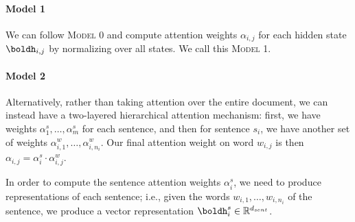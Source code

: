 \documentclass[12pt]{report}
\begin{document}
\paragraph{Model 1} We can follow \textsc{Model 0} and compute attention weights $\alpha_{i,j}$ for each hidden state $\boldh_{i,j}$ by normalizing over all states. We call this \textsc{Model 1}.

\paragraph{Model 2} Alternatively, rather than taking attention over the entire document, we can instead have a two-layered hierarchical attention mechanism: first, we have weights $\alpha_1^s, \ldots, \alpha_m^s$ for each sentence, and then for sentence $s_i$, we have another set of weights $\alpha_{i,1}^w, \ldots, \alpha_{i,n_i}^w$.
Our final attention weight on word $w_{i,j}$ is then $\alpha_{i,j} = \alpha_i^s \cdot \alpha_{i,j}^w$.

In order to compute the sentence attention weights $\alpha_i^s$, we need to produce representations of each sentence; i.e., given the words $w_{i,1}, \ldots, w_{i, n_i}$ of the sentence, we produce a vector representation $\boldh^s_i \in \mathbb{R}^{d_{sent}}$.
\end{document}
